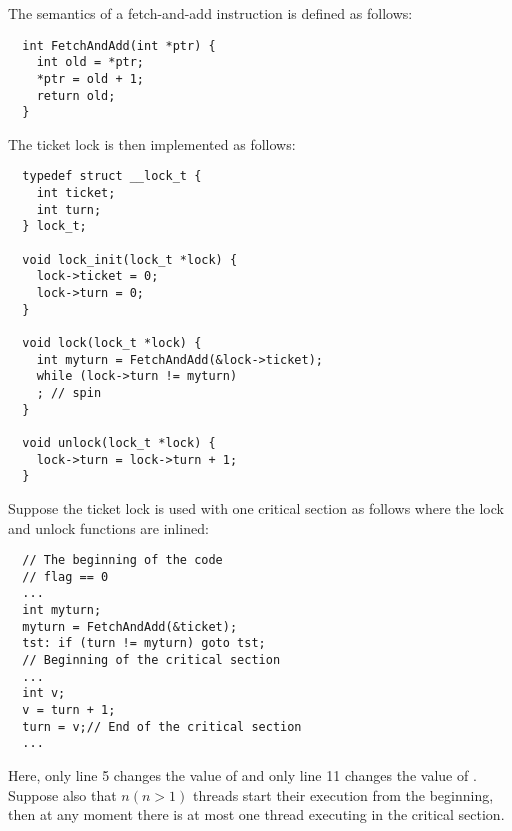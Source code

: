 \documentclass{article}[10pt]
\begin{document}
\begin{mythm}
\label{thm:ticket-lock-correct}

The semantics of a fetch-and-add instruction is defined as follows:
%
\begin{lstlisting}
  int FetchAndAdd(int *ptr) {
    int old = *ptr;
    *ptr = old + 1;
    return old;
  }  
\end{lstlisting}
%
The ticket lock is then implemented as follows:
%
\begin{lstlisting}
  typedef struct __lock_t {
    int ticket;
    int turn;
  } lock_t;

  void lock_init(lock_t *lock) {
    lock->ticket = 0;
    lock->turn = 0;
  }

  void lock(lock_t *lock) {
    int myturn = FetchAndAdd(&lock->ticket);
    while (lock->turn != myturn)
    ; // spin
  }

  void unlock(lock_t *lock) {
    lock->turn = lock->turn + 1;
  }  
\end{lstlisting}
%
Suppose the ticket lock is used with one critical section as follows
where the lock and unlock functions are inlined:
%
\begin{lstlisting}
  // The beginning of the code
  // flag == 0
  ...
  int myturn;
  myturn = FetchAndAdd(&ticket);
  tst: if (turn != myturn) goto tst;
  // Beginning of the critical section
  ...
  int v;
  v = turn + 1; 
  turn = v;// End of the critical section
  ...
\end{lstlisting}
%
Here, only line 5 changes the value of \kticket and only line 11
changes the value of \kturn.
%
Suppose also that $n (n > 1)$ threads start their execution from the
beginning, then at any moment there is at most one thread executing in
the critical section.
\end{mythm}
%
\end{document}
